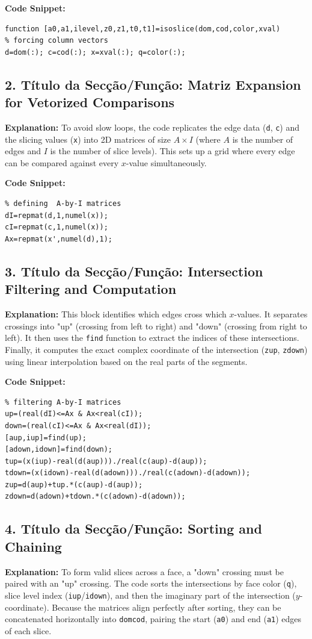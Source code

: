 \textbf{Code Snippet:}
\begin{lstlisting}
function [a0,a1,ilevel,z0,z1,t0,t1]=isoslice(dom,cod,color,xval)
% forcing column vectors
d=dom(:); c=cod(:); x=xval(:); q=color(:);
\end{lstlisting}

\subsection*{2. Título da Secção/Função: Matriz Expansion for Vetorized Comparisons}
\textbf{Explanation:} To avoid slow loops, the code replicates the edge data (\texttt{d}, \texttt{c}) and the slicing values (\texttt{x}) into 2D matrices of size $A \times I$ (where $A$ is the number of edges and $I$ is the number of slice levels). This sets up a grid where every edge can be compared against every $x$-value simultaneously.

\textbf{Code Snippet:}
\begin{lstlisting}
% defining  A-by-I matrices
dI=repmat(d,1,numel(x));
cI=repmat(c,1,numel(x));
Ax=repmat(x',numel(d),1);
\end{lstlisting}

\subsection*{3. Título da Secção/Função: Intersection Filtering and Computation}
\textbf{Explanation:} This block identifies which edges cross which $x$-values. It separates crossings into "up" (crossing from left to right) and "down" (crossing from right to left). It then uses the \texttt{find} function to extract the indices of these intersections. Finally, it computes the exact complex coordinate of the intersection (\texttt{zup}, \texttt{zdown}) using linear interpolation based on the real parts of the segments.

\textbf{Code Snippet:}
\begin{lstlisting}
% filtering A-by-I matrices
up=(real(dI)<=Ax & Ax<real(cI));
down=(real(cI)<=Ax & Ax<real(dI));
[aup,iup]=find(up);
[adown,idown]=find(down);
tup=(x(iup)-real(d(aup)))./real(c(aup)-d(aup));
tdown=(x(idown)-real(d(adown)))./real(c(adown)-d(adown));
zup=d(aup)+tup.*(c(aup)-d(aup));
zdown=d(adown)+tdown.*(c(adown)-d(adown));
\end{lstlisting}

\subsection*{4. Título da Secção/Função: Sorting and Chaining}
\textbf{Explanation:} To form valid slices across a face, a "down" crossing must be paired with an "up" crossing. The code sorts the intersections by face color (\texttt{q}), slice level index (\texttt{iup}/\texttt{idown}), and then the imaginary part of the intersection ($y$-coordinate). Because the matrices align perfectly after sorting, they can be concatenated horizontally into \texttt{domcod}, pairing the start (\texttt{a0}) and end (\texttt{a1}) edges of each slice.

